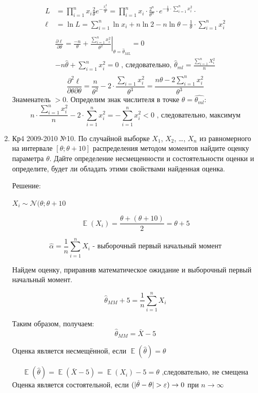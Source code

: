 \documentclass[a4paper,11pt]{article}
\DeclareMathOperator{\E}{\mathbb{E}}
\let\P\relax
\DeclareMathOperator{\P}{\mathbb{P}}
\newcommand{\cN}{\mathcal{N}}
\begin{document}
\begin{enumerate}
\begin{align*}
L &= \prod_{i=1}^n x_i \frac{2}{\theta} e^{- \frac{x_i^2}{\theta}}  = \prod_{i=1}^n x_i \cdot \frac{2^n}{\theta^n} \cdot e^{-\frac{1}{\theta} \cdot \sum_{i=1}^n x_i^2 } \cdot   \\
\ell &= \ln L = \sum_{i=1}^n \ln x_i + n \ln 2 - n \ln\theta - \frac{1}{\theta} \cdot \sum_{i=1}^n x_i^2 \\
\end{align*}
\begin{align*}
\frac{\partial \ell}{\partial \theta} = \left. \frac{-n}{\theta} + \frac{\sum_{i=1}^n x_i^2} {\theta^2} \right|_{\theta = \hat \theta_{ML}} = 0 \\
-n \hat {\theta} + \sum_{i=1}^n x_i^2 = 0 \text{ , следовательно, } \hat \theta_{ml} = \frac{\sum_{i=1}^n X_i^2}{n} \\
\end{align*}
\[
\frac{\partial^2 \ell}{\partial \theta \partial \theta} = \frac{n}{\theta^2} - 2 \cdot \frac{\sum_{i=1} x_i^2}{\theta^3} = \frac{n\theta - 2\sum_{i=1}^n x_i^2}{\theta^3}
\]
Знаменатель $>0$. Определим знак числителя в точке $\theta = \hat{\theta_{ml}}$:
\[
n \cdot \frac{\sum_{i=1}^n x_i^2}{n} - 2 \cdot \sum_{i=1}^n x_i^2  = - \sum_{i=1}^n x_i^2 < 0 \text{ , следовательно, } максимум
\]

\item \label{Кр4 2009-2010 №10} Кр4 2009-2010 №10. По случайной выборке $X_1$, $X_2$, \ldots, $X_n$ из равномерного на интервале $[\theta;\theta+10]$ распределения методом моментов найдите оценку параметра $\theta$. Дайте определение несмещенности и состоятельности оценки и определите, будет ли обладать этими свойствами найденная оценка.

Решение:

$X_i \sim \cN(\theta; \theta + 10$

\[
\E (X_i) = \frac{\theta + (\theta + 10 )}{2} = \theta + 5
\]

\[
\hat \alpha = \frac{1}{n} \sum_{i=1}^n X_i \text{ - выборочный первый начальный момент}
\]

Найдем оценку, приравняв математическое ожидание и выборочный первый начальный момент.

\[
\hat \theta_{MM} + 5 = \frac{1}{n} \sum_{i=1}^n X_i
\]

Таким образом, получаем:
\[
\hat \theta_{MM} = \bar X - 5
\]

Оценка является несмещённой, если $\E (\hat \theta) = \theta$

\[
\E(\hat \theta) = \E(\bar X - 5) = \E(X_i) - 5 = \theta \text{ ,следовательно, не смещена}
\]
Оценка является состоятельной, если $\P(|\hat \theta - \theta| > \varepsilon) \stackrel{\P}{\rightarrow} 0$ при $n \rightarrow \infty$


\end{enumerate}
\end{document}
